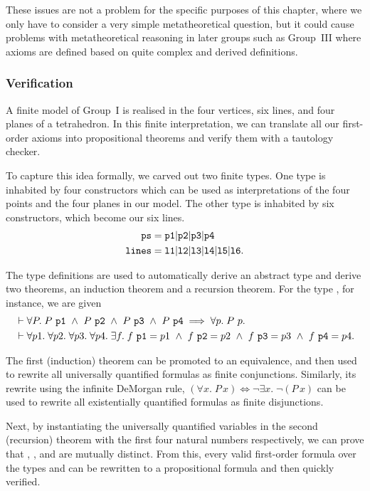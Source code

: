 These issues are not a problem for the specific purposes of this chapter, where we only have to consider a very simple metatheoretical question, but it could cause problems with metatheoretical reasoning in later groups such as Group~III where axioms are defined based on quite complex and derived definitions.

\subsubsection{Verification}
A finite model of Group~I is realised in the four vertices, six lines, and four planes of a tetrahedron. In this finite interpretation, we can translate all our first-order axioms into propositional theorems and verify them with a tautology checker.

To capture this idea formally, we carved out two finite types. One type is inhabited by four constructors which can be used as interpretations of the four points and the four planes in our model. The other type is inhabited by six constructors, which become our six lines.
\begin{align*}
\texttt{ps}   &= \texttt{p1} \vert \texttt{p2} \vert\texttt{p3} \vert\texttt{p4}\\
\texttt{lines}&= \texttt{l1} \vert \texttt{l2} \vert\texttt{l3} \vert\texttt{l4} \vert\texttt{l5} \vert\texttt{l6}.
\end{align*}

The type definitions are used to automatically derive an abstract type and derive two theorems, an induction theorem and a recursion theorem. For the type , for instance, we are given
\begin{align*}
&\vdash\forall P.\; P\ \code{p1}\ \wedge\ P\ \code{p2}\ \wedge\ P\ \code{p3}\ \wedge\ P\ \code{p4}\implies\forall p.\; P\ p.\\
&\vdash\forall p1.\;\forall p2.\;\forall p3.\;\forall p4.\; \exists f.\; f\ \code{p1} = p1\ \wedge\ f\ \code{p2} = p2\ \wedge\ f\ \code{p3} = p3\ \wedge\ f\ \code{p4} = p4.
\end{align*}

The first (induction) theorem can be promoted to an equivalence, and then used to rewrite all universally quantified formulas as finite conjunctions. Similarly, its rewrite using the infinite DeMorgan rule, $(\forall x.\; P\,x) \iff \neg\exists x.\; \neg (P\,x)$ can be used to rewrite all existentially quantified formulas as finite disjunctions.

Next, by instantiating the universally quantified variables in the second (recursion) theorem with the first four natural numbers respectively, we can prove that , ,  and  are mutually distinct. From this, every valid first-order formula over the types  and  can be rewritten to a propositional formula and then quickly verified.

